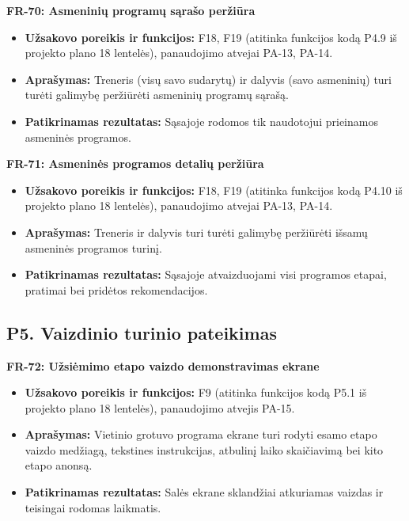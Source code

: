 \vspace{0.3cm}
\noindent\textbf{FR-70: Asmeninių programų sąrašo peržiūra}
\begin{itemize}
    \item \textbf{Užsakovo poreikis ir funkcijos:} F18, F19 (atitinka funkcijos kodą P4.9 iš projekto plano 18 lentelės), panaudojimo atvejai PA-13, PA-14.
    \item \textbf{Aprašymas:} Treneris (visų savo sudarytų) ir dalyvis (savo asmeninių) turi turėti galimybę peržiūrėti asmeninių programų sąrašą.
    \item \textbf{Patikrinamas rezultatas:} Sąsajoje rodomos tik naudotojui prieinamos asmeninės programos.
\end{itemize}

\vspace{0.3cm}
\noindent\textbf{FR-71: Asmeninės programos detalių peržiūra}
\begin{itemize}
    \item \textbf{Užsakovo poreikis ir funkcijos:} F18, F19 (atitinka funkcijos kodą P4.10 iš projekto plano 18 lentelės), panaudojimo atvejai PA-13, PA-14.
    \item \textbf{Aprašymas:} Treneris ir dalyvis turi turėti galimybę peržiūrėti išsamų asmeninės programos turinį.
    \item \textbf{Patikrinamas rezultatas:} Sąsajoje atvaizduojami visi programos etapai, pratimai bei pridėtos rekomendacijos.
\end{itemize}

\subsection{P5. Vaizdinio turinio pateikimas}

\vspace{0.3cm}
\noindent\textbf{FR-72: Užsiėmimo etapo vaizdo demonstravimas ekrane}
\begin{itemize}
    \item \textbf{Užsakovo poreikis ir funkcijos:} F9 (atitinka funkcijos kodą P5.1 iš projekto plano 18 lentelės), panaudojimo atvejis PA-15.
    \item \textbf{Aprašymas:} Vietinio grotuvo programa ekrane turi rodyti esamo etapo vaizdo medžiagą, tekstines instrukcijas, atbulinį laiko skaičiavimą bei kito etapo anonsą.
    \item \textbf{Patikrinamas rezultatas:} Salės ekrane sklandžiai atkuriamas vaizdas ir teisingai rodomas laikmatis.
\end{itemize}

